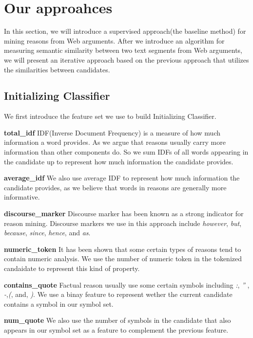 \documentclass[11pt,a4paper]{article}
\begin{document}
\section{Our approahces}
\label{sec:approach}

In this section, we will introduce a supervised approach(the baseline method) for mining reasons from Web arguments. After we introduce an algorithm for measuring semantic similarity between two text segments from Web arguments, we will present an iterative approach based on the previous approach that utilizes the similarities between candidates. 

\subsection{Initializing Classifier}

We first introduce the feature set we use to build Initializing Classifier.

{\bf total\_idf} IDF(Inverse Document Frequency) is a measure of how much information a word provides\cite{salton1986introduction}. As we argue that reasons usually carry more information than other components do. So we sum IDFs of all words appearing in the candidate up to represent how much information the candidate provides.  

{\bf average\_idf} We also use average IDF to represent how much information the candidate provides, as we believe that words in reasons are generally more informative.

{\bf discourse\_marker} Discourse marker has been known as a strong indicator for reason mining\cite{stab2014argumentation}. Discourse markers we use in this approach include {\it however}, {\it but}, {\it because}, {\it since}, {\it hence}, and {\it as}.

{\bf numeric\_token} It has been shown that some certain types of reasons tend to contain numeric analysis\cite{rinott2015show}. We use the number of numeric token in the tokenized candaidate to represent this kind of property.

{\bf contains\_quote} Factual reason usually use some certain symbols including {\it :}, {\it ''} , {\it -},{\it (}, and, {\it )}\cite{rinott2015show}.  We use a binay feature to represent wether the current candidate contains a symbol in our symbol set.

{\bf num\_quote} We also use the number of symbols in the candidate that also appears in our symbol set as a feature to complement the previous feature.
\end{document}
